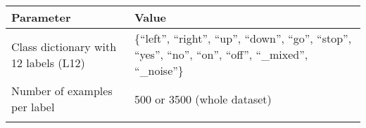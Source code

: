 \begin{table}[ht!]
\scriptsize
\begin{center}
\begin{tabular}{ M{4cm}  M{5cm}}
\toprule
\textbf{Parameter} & \textbf{Value} \\
\midrule
Class dictionary with 12 labels (L12) & \{\enquote{left},  \enquote{right}, \enquote{up}, \enquote{down}, \enquote{go}, \enquote{stop}, \enquote{yes}, \enquote{no}, \enquote{on}, \enquote{off}, \enquote{\_mixed}, \enquote{\_noise}\}\\
\midrule
Number of examples per label & 500 or 3500 (whole dataset) \\ 
\bottomrule
\label{tab:exp_details_params_dataset}
\end{tabular}
\end{center}
\end{table}
